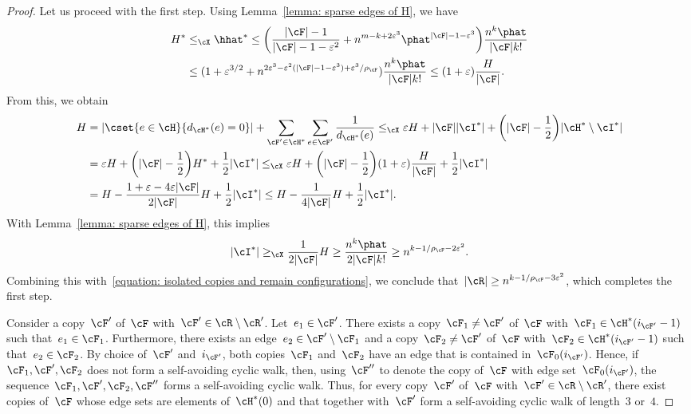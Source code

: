 \documentclass[11pt]{amsart}
\newcommand{\eps}{\varepsilon}
\DeclarePairedDelimiter{\paren}{\lparen}{\rparen}
\DeclarePairedDelimiter{\abs}{\lvert}{\rvert}
\newcommand{\Xleq}{\leq_{\cX}}
\newcommand{\Xgeq}{\geq_{\cX}}
\theoremstyle{definition}
\numberwithin{equation}{section}
\begin{document}
\begin{proof}
		Let us proceed with the first step.
		Using Lemma~\ref{lemma: sparse edges of H}, we have
		\begin{equation}\label{equation: upper bound on H^*}
			\begin{aligned}
				H^*
				&\Xleq \hhat^*
				\leq \paren[\bigg]{\frac{\abs{\cF}-1}{\abs{\cF}-1-\eps^2}+n^{m-k+2\eps^3}\phat^{\abs{\cF}-1-\eps^3}}\frac{n^k\phat}{\abs{\cF}k!}\\
				&\leq(1+\eps^{3/2}+n^{2\eps^3-\eps^2(\abs{\cF}-1-\eps^3)+\eps^3/\rho_\cF})\frac{n^k\phat}{\abs{\cF}k!}
				\leq (1+\eps)\frac{H}{\abs{\cF}}.
			\end{aligned}
		\end{equation}
		From this, we obtain
		\begin{equation}\label{equation: edges and isolated copies}
			\begin{aligned}
				H&=\abs{\cset{ e\in\cH }{ d_{\cH^*}(e)=0 }}+\sum_{\cF'\in\cH^*}\sum_{e\in\cF'}\frac{1}{d_{\cH^*}(e)}
				\Xleq \eps H+\abs{\cF}\abs{\cI^*}+\paren[\bigg]{\abs{\cF}-\frac{1}{2}}\abs{\cH^*\setminus\cI^*}\\
				&= \eps H+\paren[\bigg]{\abs{\cF}-\frac{1}{2}}H^* +\frac{1}{2}\abs{\cI^*}
				\Xleq \eps H+\paren[\bigg]{\abs{\cF}-\frac{1}{2}}(1+\eps)\frac{H}{\abs{\cF}} +\frac{1}{2}\abs{\cI^*}\\
				&= H -\frac{1+\eps-4\eps\abs{\cF}}{2\abs{\cF}}H+\frac{1}{2}\abs{\cI^*}
				\leq H-\frac{1}{4\abs{\cF}} H+\frac{1}{2}\abs{\cI^*}.
			\end{aligned}
		\end{equation}
		With Lemma~\ref{lemma: sparse edges of H}, this implies
		\begin{equation}\label{equation: lower bound isolation}
			\abs{\cI^*}
			\Xgeq \frac{1}{2\abs{\cF}} H
			\geq \frac{n^k\phat}{2\abs{\cF}k!}
			\geq n^{k-1/\rho_\cF-2\eps^2}.
		\end{equation}
		Combining this with~\eqref{equation: isolated copies and remain configurations}, we conclude that~$\abs{\cR}\geq n^{k-1/\rho_\cF-3\eps^{2}}$, which completes the first step.
		
		Consider a copy~$\cF'$ of~$\cF$ with~$\cF'\in\cR\setminus\cR'$.
		Let~$e_1\in\cF'$.
		There exists a copy~$\cF_1\neq\cF'$ of~$\cF$ with~$\cF_1\in\cH^*(i_{\cF'}-1)$ such that~$e_1\in\cF_1$.
		Furthermore, there exists an edge~$e_2\in\cF'\setminus\cF_1$ and a copy~$\cF_2\neq\cF'$ of~$\cF$ with~$\cF_2\in\cH^*(i_{\cF'}-1)$ such that~$e_2\in\cF_2$.
		By choice of~$\cF'$ and~$i_{\cF'}$, both copies~$\cF_1$ and~$\cF_2$ have an edge that is contained in~$\cF_0(i_{\cF'})$.
		Hence, if~$\cF_1,\cF',\cF_2$ does not form a self-avoiding cyclic walk, then, using~$\cF''$ to denote the copy of~$\cF$ with edge set~$\cF_0(i_{\cF'})$, the sequence~$\cF_1,\cF',\cF_2,\cF''$ forms a self-avoiding cyclic walk.
		Thus, for every copy~$\cF'$ of~$\cF$ with~$\cF'\in\cR\setminus\cR'$, there exist copies of~$\cF$ whose edge sets are elements of~$\cH^*(0)$ and that together with~$\cF'$ form a self-avoiding cyclic walk of length~$3$ or~$4$.
		

\end{proof}
\end{document}
